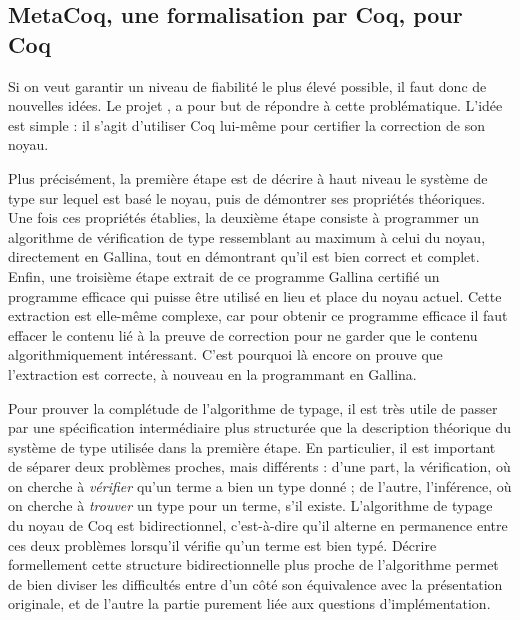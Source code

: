 \subsection{MetaCoq, une formalisation par Coq, pour Coq}
\label{sec:intro-metacoq}


Si on veut garantir un niveau de fiabilité le plus élevé possible, il faut donc de nouvelles idées.
Le projet , a pour but de répondre à cette problématique.
L’idée est simple : il s’agit d’utiliser Coq lui-même pour certifier la correction de son noyau.

Plus précisément, la première étape est de décrire à haut niveau le système de type sur lequel est basé le noyau, puis de démontrer ses propriétés théoriques.
Une fois ces propriétés établies, la deuxième étape consiste à programmer un algorithme de vérification de type ressemblant au maximum à celui du noyau, directement en Gallina,
tout en démontrant qu’il est bien correct
et complet.
Enfin, une troisième étape extrait de ce programme Gallina certifié
un programme efficace qui puisse être utilisé en lieu et place du noyau actuel.
Cette extraction est elle-même complexe, car pour obtenir ce programme efficace il
faut effacer le contenu lié à la preuve de correction
pour ne garder que le contenu algorithmiquement intéressant.
C’est pourquoi là encore on prouve que l’extraction est correcte,
à nouveau en la programmant en Gallina.

Pour prouver la complétude de l’algorithme de typage, il est très utile de
passer par une spécification intermédiaire plus structurée que la description
théorique du système de type utilisée dans la première étape.
En particulier, il est important de séparer deux problèmes proches, mais
différents :
d'une part, la vérification, où on cherche à \emph{vérifier}
qu’un terme a bien un type
donné ; de l’autre, l’inférence, où on cherche à \emph{trouver}
un type pour un terme, s'il existe.
L’algorithme de typage du noyau de Coq est bidirectionnel,
c'est-à-dire qu’il alterne en permanence entre ces deux problèmes
lorsqu’il vérifie qu’un terme est bien typé.
Décrire formellement cette structure bidirectionnelle plus proche de l’algorithme
permet de bien diviser les difficultés entre d’un côté
son équivalence avec la présentation
originale, et de l’autre la partie purement liée aux questions d’implémentation.

